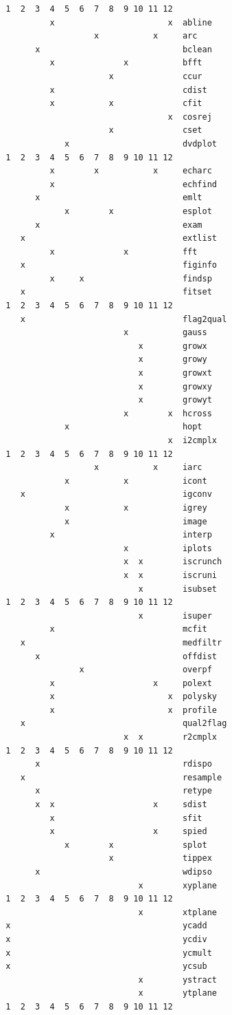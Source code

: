 \documentclass[11pt,twoside]{article}
\begin{document}
\begin{verbatim}
 1  2  3  4  5  6  7  8  9 10 11 12
          x                       x  abline
                   x           x     arc
       x                             bclean
          x              x           bfft
                      x              ccur
          x                          cdist
          x           x              cfit
                                  x  cosrej
                      x              cset
             x                       dvdplot
 1  2  3  4  5  6  7  8  9 10 11 12
          x        x           x     echarc
          x                          echfind
       x                             emlt
             x        x              esplot
       x                             exam
    x                                extlist
          x              x           fft
    x                                figinfo
          x     x                    findsp
    x                                fitset
 1  2  3  4  5  6  7  8  9 10 11 12
    x                                flag2qual
                         x           gauss
                            x        growx
                            x        growy
                            x        growxt
                            x        growxy
                            x        growyt
                         x        x  hcross
             x                       hopt
                                  x  i2cmplx
 1  2  3  4  5  6  7  8  9 10 11 12
                   x           x     iarc
             x           x           icont
    x                                igconv
             x           x           igrey
             x                       image
          x                          interp
                         x           iplots
                         x  x        iscrunch
                         x  x        iscruni
                            x        isubset
 1  2  3  4  5  6  7  8  9 10 11 12
                            x        isuper
          x                          mcfit
    x                                medfiltr
       x                             offdist
                x                    overpf
          x                    x     polext
          x                       x  polysky
          x                       x  profile
    x                                qual2flag
                         x  x        r2cmplx
 1  2  3  4  5  6  7  8  9 10 11 12
       x                             rdispo
    x                                resample
       x                             retype
       x  x                    x     sdist
          x                          sfit
          x                    x     spied
             x        x              splot
                      x              tippex
       x                             wdipso
                            x        xyplane
 1  2  3  4  5  6  7  8  9 10 11 12
                            x        xtplane
 x                                   ycadd
 x                                   ycdiv
 x                                   ycmult
 x                                   ycsub
                            x        ystract
                            x        ytplane
 1  2  3  4  5  6  7  8  9 10 11 12
\end{verbatim}
\end{document}
